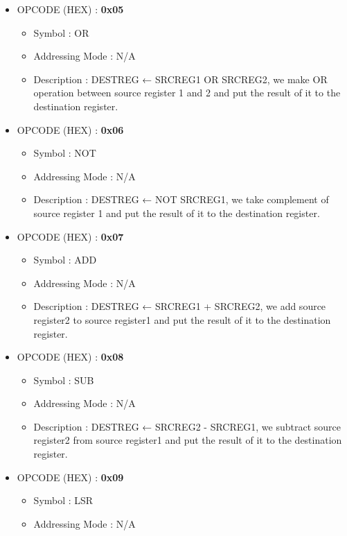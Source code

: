 \documentclass[pdftex,12pt,a4paper]{article}
\begin{document}
\begin{itemize}
\begin{itemize}
        \end{itemize}    
    \item OPCODE (HEX) :  \textbf{0x05} 
        \begin{itemize}
            \item Symbol : OR
            \item Addressing Mode : N/A
            \item Description : DESTREG ← SRCREG1 OR SRCREG2, we make OR operation between source register 1 and 2 and put the result of it to the destination register.
        \end{itemize}    
    \item OPCODE (HEX) :  \textbf{0x06}
        \begin{itemize}
            \item Symbol : NOT
            \item Addressing Mode : N/A
            \item Description : DESTREG ← NOT SRCREG1, we take complement of source register 1 and put the result of it to the destination register.
        \end{itemize}    
    \item OPCODE (HEX) : \textbf{0x07}
        \begin{itemize}
            \item Symbol : ADD
            \item Addressing Mode : N/A
            \item Description : DESTREG ← SRCREG1 + SRCREG2, we add source register2 to source register1 and put the result of it to  the destination register.
        \end{itemize}   
    \item OPCODE (HEX) : \textbf{0x08}
        \begin{itemize}
            \item Symbol : SUB
            \item Addressing Mode : N/A
            \item Description : DESTREG ← SRCREG2 - SRCREG1, we subtract source register2 from source register1 and put the result of it to  the destination register.
        \end{itemize}    
    \item OPCODE (HEX) : \textbf{0x09} 
        \begin{itemize}
            \item Symbol : LSR
            \item Addressing Mode : N/A

\end{itemize}
\end{itemize}
\end{document}

